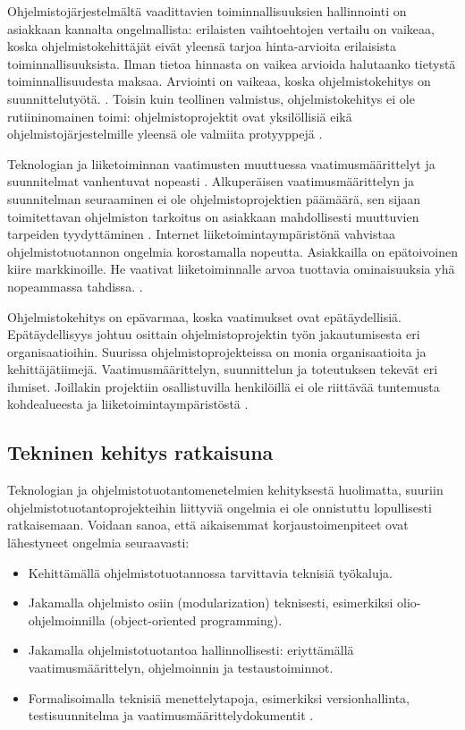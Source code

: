 \documentclass[finnish]{tktltiki2}
\theoremstyle{definition}
\theoremstyle{remark}
\begin{document}
Ohjelmistojärjestelmältä vaadittavien toiminnallisuuksien hallinnointi on asiakkaan kannalta ongelmallista: erilaisten vaihtoehtojen vertailu on vaikeaa, koska ohjelmistokehittäjät eivät yleensä tarjoa hinta-arvioita erilaisista toiminnallisuuksista. Ilman tietoa hinnasta on vaikea arvioida halutaanko tietystä toiminnallisuudesta maksaa. Arviointi on vaikeaa, koska ohjelmistokehitys on suunnittelutyötä. \cite{FOW01a}. Toisin kuin teollinen valmistus, ohjelmistokehitys ei ole rutiininomainen toimi: ohjelmistoprojektit ovat yksilöllisiä eikä ohjelmistojärjestelmille yleensä ole valmiita protyyppejä \cite{KES95}.

Teknologian ja liiketoiminnan vaatimusten muuttuessa vaatimusmäärittelyt ja suunnitelmat vanhentuvat nopeasti \cite{WIC03}. Alkuperäisen vaatimusmäärittelyn ja suunnitelman seuraaminen ei ole ohjelmistoprojektien päämäärä, sen sijaan toimitettavan ohjelmiston tarkoitus on asiakkaan mahdollisesti muuttuvien tarpeiden tyydyttäminen \cite{HIC01}. Internet liiketoimintaympäristönä vahvistaa ohjelmistotuotannon ongelmia korostamalla nopeutta. Asiakkailla on epätoivoinen kiire markkinoille. He vaativat liiketoiminnalle arvoa tuottavia ominaisuuksia yhä nopeammassa tahdissa. \cite{BRL03}.

Ohjelmistokehitys on epävarmaa, koska vaatimukset ovat epätäydellisiä. Epätäydellisyys johtuu osittain ohjelmistoprojektin työn jakautumisesta eri organisaatioihin.
Suurissa ohjelmistoprojekteissa on monia organisaatioita ja kehittäjätiimejä. Vaatimusmäärittelyn, suunnittelun ja toteutuksen tekevät eri ihmiset. Joillakin projektiin osallistuvilla henkilöillä ei ole riittävää tuntemusta kohdealueesta ja liiketoimintaympäristöstä \cite{KES95}.

\subsection{Tekninen kehitys ratkaisuna}

Teknologian ja ohjelmistotuotantomenetelmien kehityksestä huolimatta, suuriin ohjelmistotuotantoprojekteihin liittyviä ongelmia ei ole onnistuttu lopullisesti ratkaisemaan.
Voidaan sanoa, että aikaisemmat korjaustoimenpiteet ovat lähestyneet ongelmia seuraavasti:
\begin{itemize}
\item Kehittämällä ohjelmistotuotannossa tarvittavia teknisiä työkaluja.
\item Jakamalla ohjelmisto osiin (modularization) teknisesti, esimerkiksi olio-ohjelmoinnilla (object-oriented programming).
\item Jakamalla ohjelmistotuotantoa hallinnollisesti: eriyttämällä vaatimus\-määrittelyn, ohjelmoinnin ja testaustoiminnot.
\item Formalisoimalla teknisiä menettelytapoja, esimerkiksi versionhallinta, testisuunnitelma ja vaatimusmäärittelydokumentit \cite{KES95}.
\end{itemize}
\end{document}
